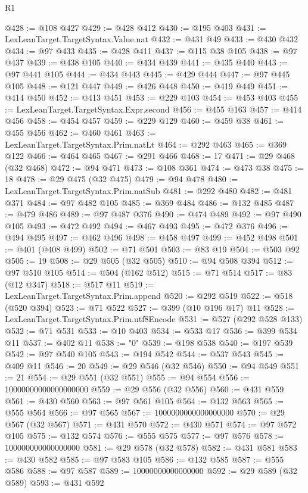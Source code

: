 \begin{lexlean}{R1}
\begin{coremodule}
{{{{{{{{{{{{{{{{{{{{{{{{{{{{{{{{{{{{{{{{{{{{{{{{{{{{{{{{{{{{{{{{{{{{{{{{{{{{{{{{{{{{{{{{{{{{{{{{{{{{{{{{{{{{{{{{{{{{{{{{{{{{{{{{{{{{{{{{{{{{{{{{{{{{{{{{{{{{{{{{{{{{{{{{{{{{{{{{{{{{{{{{{{@428 := @108 @427
@429 := @428 @412
@430 := @195 @403
@431 := LexLeanTarget.TargetSyntax.Value.nat
@432 := @431 @49
@433 := @430 @432
@434 := @97 @433
@435 := @428 @411
@437 := @115 @38 @105
@438 := @97 @437
@439 := @438 @105
@440 := @434 @439
@441 := @435 @440
@443 := @97 @441 @105
@444 := @434 @443
@445 := @429 @444
@447 := @97 @445 @105
@448 := @121 @447
@449 := @426 @448
@450 := @419 @449
@451 := @414 @450
@452 := @413 @451
@453 := @229 @103
@454 := @453 @403
@455 := LexLeanTarget.TargetSyntax.Expr.second
@456 := @455 @163
@457 := @414 @456
@458 := @454 @457
@459 := @229 @129
@460 := @459 @38
@461 := @455 @456
@462 := @460 @461
@463 := LexLeanTarget.TargetSyntax.Prim.natLt
@464 := @292 @463
@465 := @369 @122
@466 := @464 @465
@467 := @291 @466
@468 := 17
@471 := @29 @468 (@32 @468)
@472 := @94 @471
@473 := @108 @361
@474 := @473 @38
@475 := 18
@478 := @29 @475 (@32 @475)
@479 := @94 @478
@480 := LexLeanTarget.TargetSyntax.Prim.natSub
@481 := @292 @480
@482 := @481 @371
@484 := @97 @482 @105
@485 := @369 @484
@486 := @132 @485
@487 := @479 @486
@489 := @97 @487 @376
@490 := @474 @489
@492 := @97 @490 @105
@493 := @472 @492
@494 := @467 @493
@495 := @472 @376
@496 := @494 @495
@497 := @462 @496
@498 := @458 @497
@499 := @452 @498
@501 := @401 (@408 @499)
@502 := @71 @501
@503 := @83 @19
@504 := @503 @92
@505 := 19
@508 := @29 @505 (@32 @505)
@510 := @94 @508 @394
@512 := @97 @510 @105
@514 := @504 (@162 @512)
@515 := @71 @514
@517 := @83 (@12 @347)
@518 := @517 @11
@519 := LexLeanTarget.TargetSyntax.Prim.append
@520 := @292 @519
@522 := @518 (@520 @394)
@523 := @71 @522
@527 := @399 (@10 @196 @17) @11
@528 := LexLeanTarget.TargetSyntax.Prim.utf8Encode
@531 := @527 (@292 @528 @133)
@532 := @71 @531
@533 := @10 @403
@534 := @533 @17
@536 := @399 @534 @11
@537 := @402 @11
@538 := "0"
@539 := @198 @538
@540 := @197 @539
@542 := @97 @540 @105
@543 := @194 @542
@544 := @537 @543
@545 := @409 @11
@546 := 20
@549 := @29 @546 (@32 @546)
@550 := @94 @549
@551 := 21
@554 := @29 @551 (@32 @551)
@555 := @94 @554
@556 := 10000000000000000000
@559 := @29 @556 (@32 @556)
@560 := @431 @559
@561 := @430 @560
@563 := @97 @561 @105
@564 := @132 @563
@565 := @555 @564
@566 := @97 @565
@567 := 1000000000000000000
@570 := @29 @567 (@32 @567)
@571 := @431 @570
@572 := @430 @571
@574 := @97 @572 @105
@575 := @132 @574
@576 := @555 @575
@577 := @97 @576
@578 := 100000000000000000
@581 := @29 @578 (@32 @578)
@582 := @431 @581
@583 := @430 @582
@585 := @97 @583 @105
@586 := @132 @585
@587 := @555 @586
@588 := @97 @587
@589 := 10000000000000000
@592 := @29 @589 (@32 @589)
@593 := @431 @592
}}}}}}}}}}}}}}}}}}}}}}}}}}}}}}}}}}}}}}}}}}}}}}}}}}}}}}}}}}}}}}}}}}}}}}}}}}}}}}}}}}}}}}}}}}}}}}}}}}}}}}}}}}}}}}}}}}}}}}}}}}}}}}}}}}}}}}}}}}}}}}}}}}}}}}}}}}}}}}}}}}}}}}}}}}}}}}}}}}}}}}}}}}
\end{coremodule}
\end{lexlean}
